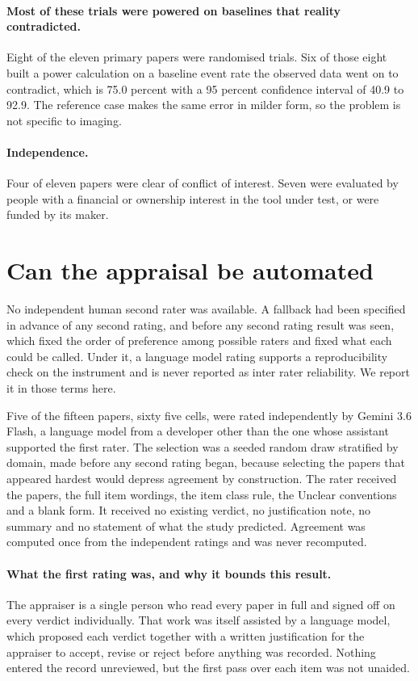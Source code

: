 \documentclass{article}
\begin{document}
\paragraph{Most of these trials were powered on baselines that reality contradicted.} Eight of the
eleven primary papers were randomised trials. Six of those eight built a power calculation on a
baseline event rate the observed data went on to contradict, which is 75.0 percent with a 95
percent confidence interval of 40.9 to 92.9. The reference case makes the same error in milder form, so the
problem is not specific to imaging.

\paragraph{Independence.} Four of eleven papers were clear of conflict of interest. Seven were
evaluated by people with a financial or ownership interest in the tool under test, or were funded
by its maker.

\section{Can the appraisal be automated}
\label{sec:auto}

No independent human second rater was available. A fallback had been specified in advance of any
second rating, and before any second rating result was seen, which fixed the order of preference
among possible raters and fixed what each could be called. Under it, a language model rating
supports a reproducibility check on the instrument and is never reported as inter rater
reliability. We report it in those terms here.

Five of the fifteen papers, sixty five cells, were rated independently by Gemini 3.6 Flash, a
language model from a developer other than the one whose assistant supported the first rater. The
selection was a seeded random draw stratified by domain, made before any second rating began,
because selecting the papers that appeared hardest would depress agreement by construction. The
rater received the
papers, the full item wordings, the item class rule, the Unclear conventions and a blank form. It
received no existing verdict, no justification note, no summary and no statement of what the study
predicted. Agreement was computed once from the independent ratings and was never recomputed.

\paragraph{What the first rating was, and why it bounds this result.} The appraiser is a single
person who read every paper in full and signed off on every verdict individually. That work was
itself assisted by a language model, which proposed each verdict together with a written
justification for the appraiser to accept, revise or reject before anything was recorded. Nothing
entered the record unreviewed, but the first pass over each item was not unaided.
\end{document}

